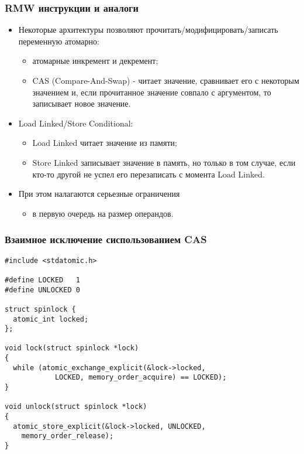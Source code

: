 \begin{frame}
\frametitle{RMW инструкции и аналоги}
\begin{itemize}
  \item Некоторые архитектуры позволяют прочитать/модифицировать/записать
  переменную атомарно:
  \begin{itemize}
    \item атомарные инкремент и декремент;
    \item CAS (Compare-And-Swap) - читает значение, сравнивает его с некоторым
    значением и, если прочитанное значение совпало с аргументом, то записывает
    новое значение.
  \end{itemize}
  \item Load Linked/Store Conditional:
  \begin{itemize}
    \item Load Linked читает значение из памяти;
    \item Store Linked записывает значение в память, но только в том случае,
    если кто-то другой не успел его перезаписать с момента Load Linked.
  \end{itemize}
  \item При этом налагаются серьезные ограничения
  \begin{itemize}
    \item в первую очередь на размер операндов.
  \end{itemize}
\end{itemize}
\end{frame}

\begin{frame}[fragile]
\frametitle{Взаимное исключение сиспользованием CAS}
\begin{lstlisting}
#include <stdatomic.h>

#define LOCKED   1
#define UNLOCKED 0

struct spinlock {
  atomic_int locked;
};

void lock(struct spinlock *lock)
{
  while (atomic_exchange_explicit(&lock->locked,
            LOCKED, memory_order_acquire) == LOCKED);
}

void unlock(struct spinlock *lock)
{
  atomic_store_explicit(&lock->locked, UNLOCKED,
    memory_order_release);
}
\end{lstlisting}
\end{frame}

